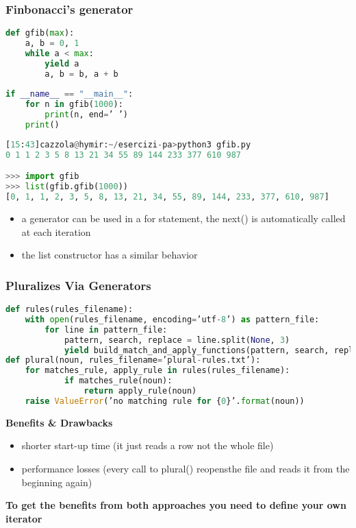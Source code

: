 \subsubsection{Finbonacci's generator}
\begin{lstlisting}[language=Python]
def gfib(max):
	a, b = 0, 1
	while a < max:
		yield a
		a, b = b, a + b
		
if __name__ == "__main__":
	for n in gfib(1000):
		print(n, end=’ ’)
	print()
\end{lstlisting}

\begin{lstlisting}[language=Python]
[15:43]cazzola@hymir:~/esercizi-pa>python3 gfib.py
0 1 1 2 3 5 8 13 21 34 55 89 144 233 377 610 987

>>> import gfib
>>> list(gfib.gfib(1000))
[0, 1, 1, 2, 3, 5, 8, 13, 21, 34, 55, 89, 144, 233, 377, 610, 987]
\end{lstlisting}

\begin{itemize}
	\item a generator can be used in a for statement, the next() is automatically called at each iteration
	\item the list constructor has a similar behavior
\end{itemize}

\subsubsection{Pluralizes Via Generators}

\begin{lstlisting}[language=Python]
def rules(rules_filename):
	with open(rules_filename, encoding=’utf-8’) as pattern_file:
		for line in pattern_file:
			pattern, search, replace = line.split(None, 3)
			yield build_match_and_apply_functions(pattern, search, replace)
def plural(noun, rules_filename=’plural-rules.txt’):
	for matches_rule, apply_rule in rules(rules_filename):
			if matches_rule(noun):
				return apply_rule(noun)
	raise ValueError(’no matching rule for {0}’.format(noun))
\end{lstlisting}

\textbf{Benefits \& Drawbacks}
\begin{itemize}
	\item shorter start-up time (it just reads a row not the whole file)
	\item performance losses (every call to plural() reopensthe file and reads it from the beginning again)
\end{itemize}

\textbf{To get the benefits from both approaches you need to define your own iterator}